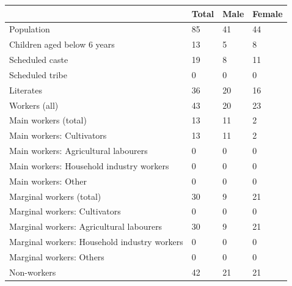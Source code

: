 \documentclass{article}
\begin{document}
\begin{tabular}{llll}
\toprule
 & Total & Male & Female \\
\midrule
Population & 85 & 41 & 44 \\
Children aged below 6 years & 13 & 5 & 8 \\
Scheduled caste & 19 & 8 & 11 \\
Scheduled tribe & 0 & 0 & 0 \\
Literates & 36 & 20 & 16 \\
Workers (all) & 43 & 20 & 23 \\
Main workers (total) & 13 & 11 & 2 \\
Main workers: Cultivators & 13 & 11 & 2 \\
Main workers: Agricultural labourers & 0 & 0 & 0 \\
Main workers: Household industry workers & 0 & 0 & 0 \\
Main workers: Other & 0 & 0 & 0 \\
Marginal workers (total) & 30 & 9 & 21 \\
Marginal workers: Cultivators & 0 & 0 & 0 \\
Marginal workers: Agricultural labourers & 30 & 9 & 21 \\
Marginal workers: Household industry workers & 0 & 0 & 0 \\
Marginal workers: Others & 0 & 0 & 0 \\
Non-workers & 42 & 21 & 21 \\
\bottomrule
\end{tabular}
\end{document}
